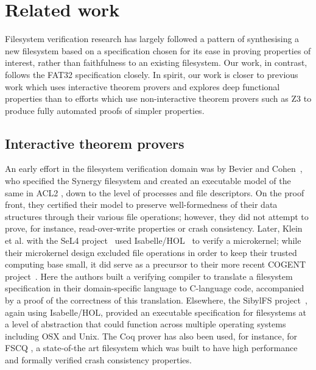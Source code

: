 \documentclass[submission,copyright,creativecommons]{eptcs}
\begin{document}
\section{Related work}

Filesystem verification research has largely followed a pattern of
synthesising a new filesystem based on a specification chosen for its
ease in proving properties of interest, rather than faithfulness to an
existing filesystem. Our work, in contrast, follows the FAT32
specification closely. In spirit, our work is closer to previous work
which uses interactive theorem provers and explores deep functional
properties than to efforts which use non-interactive theorem provers
such as Z3 to produce fully automated proofs of simpler properties.

\subsection{Interactive theorem provers}
An early effort in the filesystem verification domain was by Bevier
and Cohen~\cite{bevier1996executable}, who specified the Synergy
filesystem and created an executable model of the same in ACL2
\cite{kaufmann2000}, down to the level of processes
and file descriptors. On the proof front, they certified their model
to preserve well-formedness of their data structures through their
various file operations; however, they did not attempt to prove, for
instance, read-over-write properties or crash consistency. Later,
Klein et al. with the SeL4 project~\cite{klein2009sel4} used
Isabelle/HOL~\cite{nipkow2002isabelle} to verify a microkernel;
while their microkernel design excluded file operations in order to keep
their trusted computing base small, it did serve as a precursor to their
more recent COGENT project~\cite{amani2016cogent}. Here the authors
built a verifying compiler to translate a filesystem specification in
their domain-specific language to C-language code, accompanied by
a proof of the correctness of this translation. Elsewhere, the SibylFS
project~\cite{ridge2015sibylfs}, again using Isabelle/HOL, provided
an executable specification for filesystems at a level of abstraction
that could function across multiple operating systems including OSX
and Unix. The Coq prover \cite{bertot2013interactive} has also been
used, for instance, for FSCQ
\cite{DBLP:conf/usenix/ChenZCCKZ16}, a state-of-the art filesystem
which was built to have high performance and formally verified crash
consistency properties.
\end{document}
